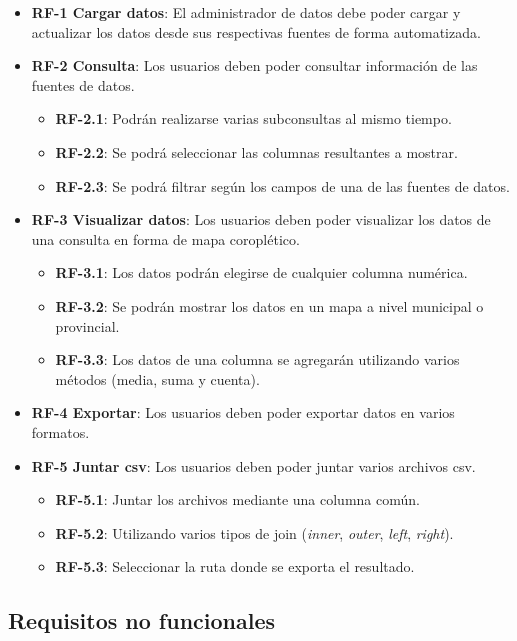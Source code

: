\begin{itemize}
	\item \textbf{RF-1 Cargar datos}: El administrador de datos debe poder cargar y actualizar los datos desde sus respectivas fuentes de forma automatizada.
	\item \textbf{RF-2 Consulta}: Los usuarios deben poder consultar información de las fuentes de datos.
	\begin{itemize}
		\item \textbf{RF-2.1}: Podrán realizarse varias subconsultas al mismo tiempo.
		\item \textbf{RF-2.2}: Se podrá seleccionar las columnas resultantes a mostrar.
		\item \textbf{RF-2.3}: Se podrá filtrar según los campos de una de las fuentes de datos.
	\end{itemize}
	\item \textbf{RF-3 Visualizar datos}: Los usuarios deben poder visualizar los datos de una consulta en forma de mapa coroplético.
	\begin{itemize}
		\item \textbf{RF-3.1}: Los datos podrán elegirse de cualquier columna numérica.
		\item \textbf{RF-3.2}: Se podrán mostrar los datos en un mapa a nivel municipal o provincial.
		\item \textbf{RF-3.3}: Los datos de una columna se agregarán utilizando varios métodos (media, suma y cuenta).
	\end{itemize}
	\item \textbf{RF-4 Exportar}: Los usuarios deben poder exportar datos en varios formatos.
	\item \textbf{RF-5 Juntar csv}: Los usuarios deben poder juntar varios archivos csv.
		\begin{itemize}
		\item \textbf{RF-5.1}: Juntar los archivos mediante una columna común.
		\item \textbf{RF-5.2}: Utilizando varios tipos de join (\textit{inner}, \textit{outer}, \textit{left}, \textit{right}).
		\item \textbf{RF-5.3}: Seleccionar la ruta donde se exporta el resultado.
	\end{itemize}
\end{itemize}

\subsection{Requisitos no funcionales}

